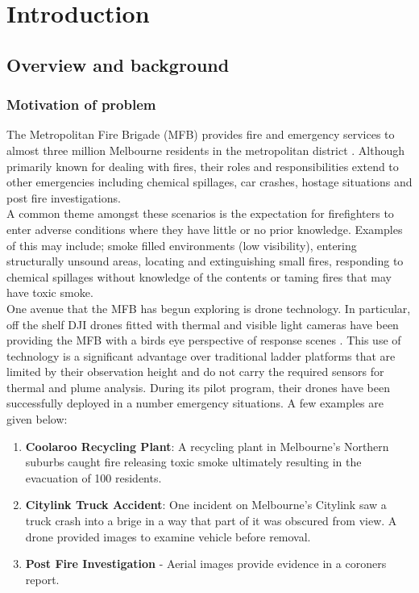\documentclass[capstone_report.tex]{subfiles}
\begin{document}
\chapter{Introduction}

\section{Overview and background}

\subsection{Motivation of problem}
The Metropolitan Fire Brigade (MFB) provides fire and emergency services to almost three million Melbourne residents in the metropolitan district \cite{mfb}.  Although primarily known for dealing with fires, their roles and responsibilities extend to other emergencies including chemical spillages, car crashes, hostage situations and post fire investigations.\\

A common theme amongst these scenarios is the expectation for firefighters to enter adverse conditions where they have little or no prior knowledge. Examples of this may include; smoke filled environments (low visibility), entering structurally unsound areas, locating and extinguishing small fires, responding to chemical spillages without knowledge of the contents or taming fires that may have toxic smoke.\\

One avenue that the MFB has begun exploring is drone technology.  In particular, off the shelf DJI drones fitted with thermal and visible light cameras have been providing the MFB with a birds eye perspective of response scenes \cite{mfb_drone}. This use of technology is a significant advantage over traditional ladder platforms that are limited by their observation height and do not carry the required sensors for thermal and plume analysis. During its pilot program, their drones have been successfully deployed in a number emergency situations. A few examples are given below:
\begin{enumerate}
    \item \textbf{Coolaroo Recycling Plant}: A recycling plant in Melbourne's Northern suburbs caught fire releasing toxic smoke ultimately resulting in the evacuation of 100 residents.
    \item \textbf{Citylink Truck Accident}: One incident on Melbourne's Citylink saw a truck crash into a brige in a way that part of it was obscured from view. A drone provided images to examine vehicle before removal.
    \item \textbf{Post Fire Investigation}  - Aerial images provide evidence in a coroners report.
\end{enumerate}
\end{document}
